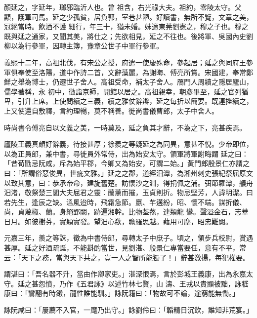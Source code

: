 
\begin{pinyinscope}

 顏延之，字延年，瑯邪臨沂人也。曾
 祖含，右光祿大夫。祖約，零陵太守。父顯，護軍司馬。延之少孤貧，居負郭，室巷甚陋。好讀書，無所不覽，文章之美，冠絕當時。飲酒不護
 細行，年三十，猶未婚。妹適東莞劉憲之，穆之子也。穆之既與延之通家，又聞其美，將仕之；先欲相見，延之不往也。後將軍、吳國內史劉柳以為行參軍，因轉主簿，豫章公世子中軍行參軍。



 義熙十二年，高祖北伐，有宋公之授，府遣一使慶殊命，參起居；延之與同府王參軍俱奉使至洛陽，道中作詩二首，文辭藻麗，為謝晦、傅亮所賞。宋國建，奉常鄭鮮之舉為博士，仍遷世子舍人。高祖受命，補太子舍人。鴈門人周續之隱居廬山，儒學著稱，永
 初中，徵詣京師，開館以居之。高祖親幸，朝彥畢至，延之官列猶卑，引升上席。上使問續之三義，續之雅仗辭辯，延之每折以簡要。既連挫續之，上又使還自敷釋，言約理暢，莫不稱善。徙尚書儀曹郎，太子中舍人。



 時尚書令傅亮自以文義之美，一時莫及，延之負其才辭，不為之下，亮甚疾焉。



 廬陵王義真頗好辭義，待接甚厚；徐羨之等疑延之為同異，意甚不悅。少帝即位，以為正員郎，兼中書，尋徙員外常侍，出為始安太守。領軍將軍謝晦謂
 延之曰：「昔荀勖忌阮咸，斥為始平郡，今卿又為始安，可謂二始。」黃門郎殷景仁亦謂之曰：「所謂俗惡俊異，世疵文雅。」延之之郡，道經汨潭，為湘州刺史張紀祭屈原文以致其意，曰：恭承帝命，建旋舊楚。訪懷沙之淵，得捐佩之浦。弭節羅潭，艤舟汨渚，敬祭楚三閭大夫屈君之靈：蘭薰而摧，玉貞則折。物忌堅芳，人諱明潔。曰若先生，逢辰之缺。溫風迨時，飛霜急節。嬴、芊遘紛，昭、懷不端。謀折儀、尚，貞蔑椒、蘭。身絕郢闕，跡遍湘幹。比物荃蓀，連類龍
 鸞。聲溢金石，志華日月。如彼樹芬，實穎實發。望汨心欷，瞻羅思越。藉用可塵，昭忠難闕。



 元嘉三年，羨之等誅，徵為中書侍郎，尋轉太子中庶子。頃之，領步兵校尉，賞遇甚厚。延之好酒疏誕，不能斟酌當世，見劉湛、殷景仁專當要任，意有不平，常云：「天下之務，當與天下共之，豈一人之智所能獨了！」辭甚激揚，每犯權要。



 謂湛曰：「吾名器不升，當由作卿家吏。」湛深恨焉，言於彭城王義康，出為永嘉太守。延之甚怨憤，乃作《五君詠》以述竹林七賢，山
 濤、王戎以貴顯被黜，詠嵇康曰：「鸞翮有時鎩，龍性誰能馴。」詠阮籍曰：「物故可不論，途窮能無慟。」



 詠阮咸曰：「屢薦不入官，一麾乃出守。」詠劉伶曰：「韜精日沉飲，誰知非荒宴。」




\end{pinyinscope}
